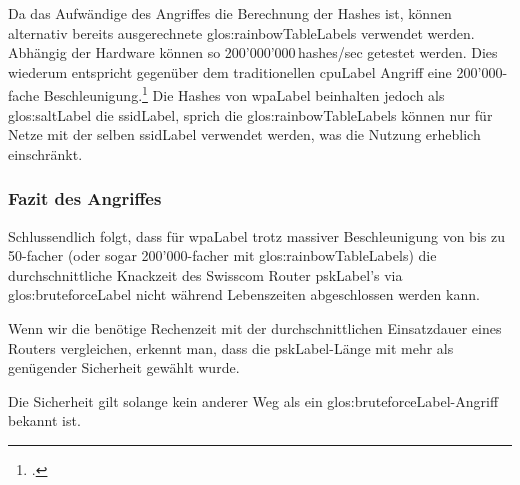 Da das Aufwändige des Angriffes die Berechnung der Hashes ist, können alternativ bereits ausgerechnete \glspl{glos:rainbowTableLabel} verwendet werden.
Abhängig der Hardware können so 200'000'000\,hashes/sec getestet werden. Dies wiederum entspricht gegenüber dem traditionellen \gls{cpuLabel} Angriff eine 200'000-fache Beschleunigung.\footcite[][160]{WrightCache201503}
Die Hashes von \gls{wpaLabel} beinhalten jedoch als \gls{glos:saltLabel} die \gls{ssidLabel}, sprich die \glspl{glos:rainbowTableLabel} können nur für Netze mit der selben \gls{ssidLabel} verwendet werden, was die Nutzung erheblich einschränkt.


\subsubsection{Fazit des Angriffes}
Schlussendlich folgt, dass für \gls{wpaLabel} trotz massiver Beschleunigung von bis zu 50-facher (oder sogar 200'000-facher mit \glspl{glos:rainbowTableLabel}) die durchschnittliche Knackzeit des Swisscom Router \gls{pskLabel}'s via \gls{glos:bruteforceLabel} nicht während Lebenszeiten abgeschlossen werden kann.

Wenn wir die benötige Rechenzeit mit der durchschnittlichen Einsatzdauer eines Routers vergleichen, erkennt man, dass die \gls{pskLabel}-Länge mit mehr als genügender Sicherheit gewählt wurde.

Die Sicherheit gilt solange kein anderer Weg als ein \gls{glos:bruteforceLabel}-Angriff bekannt ist.
